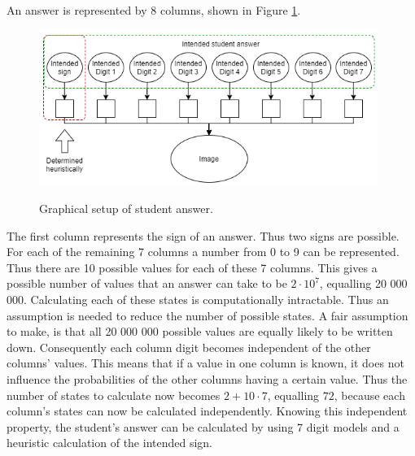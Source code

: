 An answer is represented by 8 columns, shown in Figure \ref{fig:stdAns}. \begin{figure}[b]
  \centering
  \includegraphics[width=11cm]{ans}\\
  \caption{Graphical setup of student answer.}
  \label{fig:stdAns}
\end{figure}The first column represents the sign of an answer. Thus two signs are possible. For each of the remaining 7 columns a number from 0 to 9 can be represented. Thus there are 10 possible values for each of these 7 columns. This gives a possible number of values that an answer can take to be $2\cdot 10^7$, equalling 20 000 000. Calculating each of these states is computationally intractable. Thus an assumption is needed to reduce the number of possible states. A fair assumption to make, is that all 20 000 000 possible values are equally likely to be written down. Consequently each column digit becomes independent of the other columns' values. This means that if a value in one column is known, it does not influence the probabilities of the other columns having a certain value. Thus the number of states to calculate now becomes $2+10\cdot 7$, equalling $72$, because each column's states can now be calculated independently. Knowing this independent property, the student's answer can be calculated by using 7 digit models and a heuristic calculation of the intended sign.



